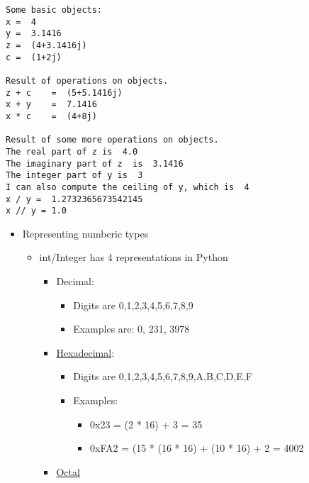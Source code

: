 \documentclass[11pt]{article}
\providecommand{\tightlist}{%
      \setlength{\itemsep}{0pt}\setlength{\parskip}{0pt}}
\begin{document}
    \begin{Verbatim}[commandchars=\\\{\}]
Some basic objects:
x =  4
y =  3.1416
z =  (4+3.1416j)
c =  (1+2j)

Result of operations on objects.
z + c 	 =  (5+5.1416j)
x + y 	 =  7.1416
x * c 	 =  (4+8j)

Result of some more operations on objects.
The real part of z is  4.0
The imaginary part of z  is  3.1416
The integer part of y is  3
I can also compute the ceiling of y, which is  4
x / y =  1.2732365673542145
x // y = 1.0

    \end{Verbatim}

    \begin{itemize}
\tightlist
\item
  Representing numberic types

  \begin{itemize}
  \tightlist
  \item
    int/Integer has 4 representations in Python

    \begin{itemize}
    \tightlist
    \item
      Decimal:

      \begin{itemize}
      \tightlist
      \item
        Digits are 0,1,2,3,4,5,6,7,8,9
      \item
        Examples are: 0, 231, 3978
      \end{itemize}
    \item
      \href{https://en.wikipedia.org/wiki/Hexadecimal}{Hexadecimal}:

      \begin{itemize}
      \tightlist
      \item
        Digits are 0,1,2,3,4,5,6,7,8,9,A,B,C,D,E,F
      \item
        Examples:

        \begin{itemize}
        \tightlist
        \item
          0x23 = (2 * 16) + 3 = 35
        \item
          0xFA2 = (15 * (16 * 16) + (10 * 16) + 2 = 4002
        \end{itemize}
      \end{itemize}
    \item
      \href{https://en.wikipedia.org/wiki/Octal}{Octal}


\end{itemize}
\end{itemize}
\end{itemize}
\end{document}
